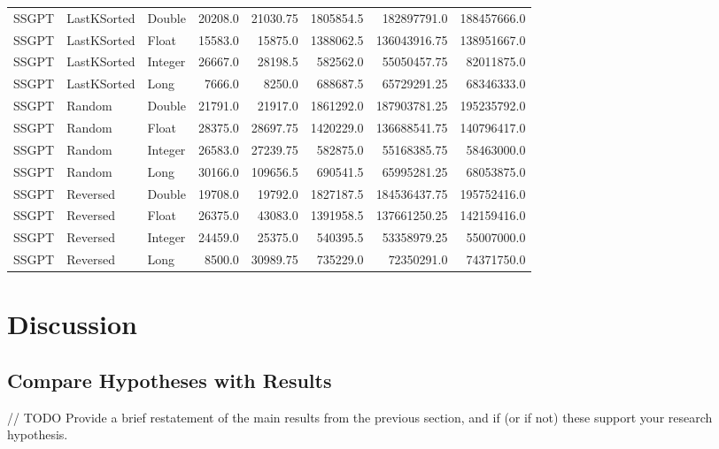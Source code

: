 \documentclass[unicode,11pt,a4paper,oneside,numbers=endperiod,openany]{scrartcl}
\begin{document}
\begin{center}
\begin{longtable}{|l|l|l|r|r|r|r|r|}
            SSGPT & LastKSorted & Double & 20208.0 & 21030.75 & 1805854.5 & 182897791.0 & 188457666.0 \\
            SSGPT & LastKSorted & Float & 15583.0 & 15875.0 & 1388062.5 & 136043916.75 & 138951667.0 \\
            SSGPT & LastKSorted & Integer & 26667.0 & 28198.5 & 582562.0 & 55050457.75 & 82011875.0 \\
            SSGPT & LastKSorted & Long & 7666.0 & 8250.0 & 688687.5 & 65729291.25 & 68346333.0 \\
            SSGPT & Random & Double & 21791.0 & 21917.0 & 1861292.0 & 187903781.25 & 195235792.0 \\
            SSGPT & Random & Float & 28375.0 & 28697.75 & 1420229.0 & 136688541.75 & 140796417.0 \\
            SSGPT & Random & Integer & 26583.0 & 27239.75 & 582875.0 & 55168385.75 & 58463000.0 \\
            SSGPT & Random & Long & 30166.0 & 109656.5 & 690541.5 & 65995281.25 & 68053875.0 \\
            SSGPT & Reversed & Double & 19708.0 & 19792.0 & 1827187.5 & 184536437.75 & 195752416.0 \\
            SSGPT & Reversed & Float & 26375.0 & 43083.0 & 1391958.5 & 137661250.25 & 142159416.0 \\
            SSGPT & Reversed & Integer & 24459.0 & 25375.0 & 540395.5 & 53358979.25 & 55007000.0 \\
            SSGPT & Reversed & Long & 8500.0 & 30989.75 & 735229.0 & 72350291.0 & 74371750.0 \\
            \hline
        \end{longtable}
    \end{center}



\section{Discussion}

    \subsection{Compare Hypotheses with Results}

    // TODO
    Provide a brief restatement of the main results from the previous section, and if (or if not) these support your research hypothesis.\\
\end{document}

